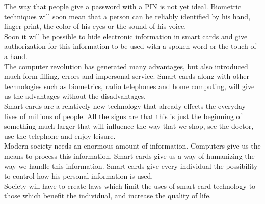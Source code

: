 The way that people give a password with a PIN is not yet ideal.
Biometric techniques will soon mean that a person can be reliably
identified by his hand, finger print, the color of his eyes or the
sound of his voice.\\

Soon it will be possible to hide electronic information in smart cards
and give authorization for this information to be used with a spoken
word or the touch of a hand.\\

The computer revolution has generated many advantages, but also
introduced much form filling, errors and impersonal service. Smart
cards along with other technologies such as biometrics, radio
telephones and home computing, will give us the advantages without the
disadvantages.\\

Smart cards are a relatively new technology that already effects the
everyday lives of millions of people. All the signs are that this is
just the beginning of something much larger that will influence the way
that we shop, see the doctor, use the telephone and enjoy leisure.\\

Modern society needs an enormous amount of information. Computers give
us the means to process this information. Smart cards give us a way of
humanizing the way we handle this information. Smart cards give every
individual the possibility to control how his personal information is
used.\\

Society will have to create laws which limit the uses of smart card
technology to those which benefit the individual, and increase the
quality of life.

